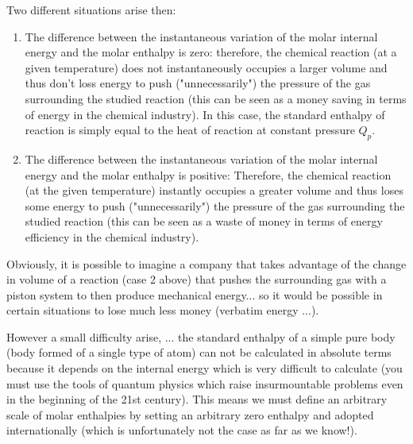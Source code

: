 	Two different situations arise then:
	\begin{enumerate}
		\item The difference between the instantaneous variation of the molar internal energy and the molar enthalpy is zero: therefore, the chemical reaction (at a given temperature) does not instantaneously occupies a larger volume and thus don't loss energy to push ("unnecessarily") the pressure of the gas surrounding the studied reaction (this can be seen as a money saving in terms of energy in the chemical industry). In this case, the standard enthalpy of reaction is simply equal to the heat of reaction at constant pressure $Q_p$.

		\item The difference between the instantaneous variation of the molar internal energy and the molar enthalpy is positive: Therefore, the chemical reaction (at the given temperature) instantly occupies a greater volume and thus loses some energy to push ("unnecessarily") the pressure of the gas surrounding the studied reaction  (this can be seen as a waste of money in terms of energy efficiency in the chemical industry).
	\end{enumerate}
	\begin{tcolorbox}[title=Remark,colframe=black,arc=10pt]
	Obviously, it is possible to imagine a company that takes advantage of the change in volume of a reaction (case 2 above) that pushes the surrounding gas with a piston system to then produce mechanical energy... so it would be possible in certain situations to lose much less money (verbatim energy ...).
	\end{tcolorbox}
	However a small difficulty arise, ... the standard enthalpy of a simple pure body (body formed of a single type of atom) can not be calculated in absolute terms because it depends on the internal energy which is very difficult to calculate (you must use the tools of quantum physics which raise insurmountable problems even in the beginning of the 21st century). This means we must define an arbitrary scale of molar enthalpies by setting an arbitrary zero enthalpy and adopted internationally (which is unfortunately not the case as far as we know!).

